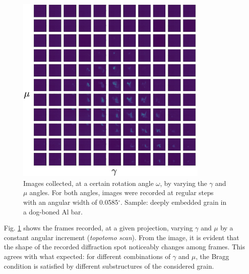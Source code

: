 \documentclass[11pt]{scrartcl}
\begin{document}
\begin{figure}[h]
    \centering
    \includegraphics[width=0.85\textwidth]{Img_one_proj}
    \caption{Images collected, at a certain rotation angle $\omega$, by varying the $\gamma$ and $\mu$ angles. For both angles, images were recorded at regular steps with an angular width of 0.0585$^{\circ}$. Sample: deeply embedded grain in a dog-boned Al bar.}
    \label{fig:all_pics_one_om}
\end{figure}

Fig. \ref{fig:all_pics_one_om} shows the frames recorded, at a given projection, varying $\gamma$ and $\mu$ by a constant angular increment ({\emph{topotomo scan}}). From the image, it is evident that the shape of the recorded diffraction spot noticeably changes among frames. This agrees with what expected: for different combinations of $\gamma$ and $\mu$, the Bragg condition is satisfied by different substructures of the considered grain.
\end{document}

